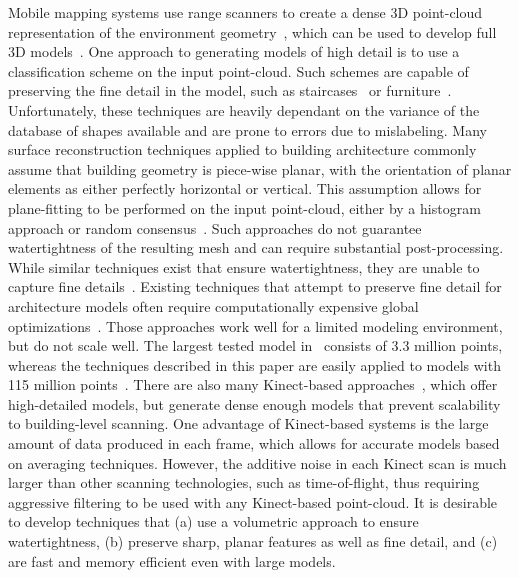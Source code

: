 \documentclass[10pt,twocolumn,twoside]{IEEEtran}
\begin{document}
Mobile mapping systems use range scanners to create a dense 3D point-cloud representation of the environment geometry~\cite{Sweep,Localization}, which can be used to develop full 3D models~\cite{Pons10,Carving}.  One approach to generating models of high detail is to use a classification scheme on the input point-cloud.  Such schemes are capable of preserving the fine detail in the model, such as staircases~\cite{Victors} or furniture~\cite{Kim12, SearchClassifyPointcloud, Shao12}.  Unfortunately, these techniques are heavily dependant on the variance of the database of shapes available and are prone to errors due to mislabeling.  Many surface reconstruction techniques applied to building architecture commonly assume that building geometry is piece-wise planar, with the orientation of planar elements as either perfectly horizontal or vertical.  This assumption allows for plane-fitting to be performed on the input point-cloud, either by a histogram approach or random consensus~\cite{HistWallRecon,Victors,BasicPlaneFit}.  Such approaches do not guarantee watertightness of the resulting mesh and can require substantial post-processing.  While similar techniques exist that ensure watertightness, they are unable to capture fine details~\cite{Museums}. Existing techniques that attempt to preserve fine detail for architecture models often require computationally expensive global optimizations~\cite{Pons10}.  Those approaches work well for a limited modeling environment, but do not scale well.  The largest tested model in~\cite{Pons10} consists of 3.3 million points, whereas the techniques described in this paper are easily applied to models with 115 million points~\cite{Turner13}.  There are also many Kinect-based approaches~\cite{Kintinuous,Zhou13,Zhou14}, which offer high-detailed models, but generate dense enough models that prevent scalability to building-level scanning.  One advantage of Kinect-based systems is the large amount of data produced in each frame, which allows for accurate models based on averaging techniques.  However, the additive noise in each Kinect scan is much larger than other scanning technologies, such as time-of-flight, thus requiring aggressive filtering to be used with any Kinect-based point-cloud.  It is desirable to develop techniques that (a) use a volumetric approach to ensure watertightness, (b) preserve sharp, planar features as well as fine detail, and (c) are fast and memory efficient even with large models.
\end{document}

